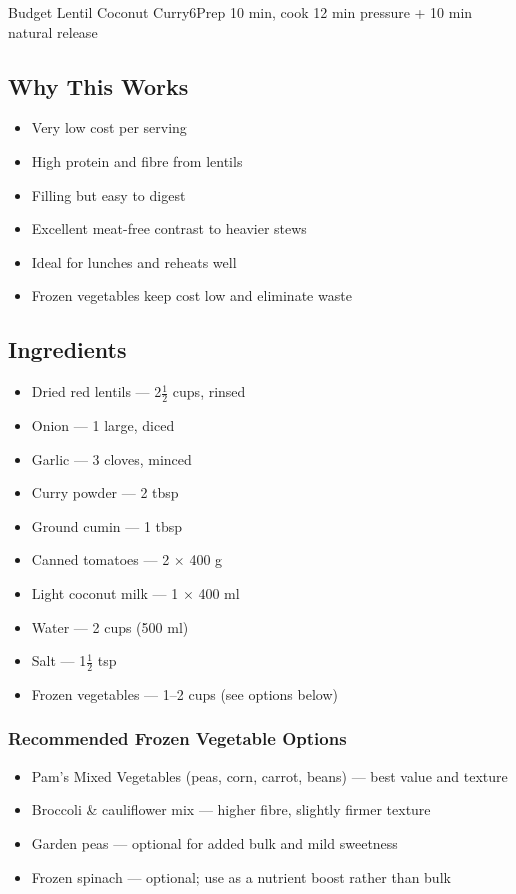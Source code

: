 \begin{recipebox}{Budget Lentil Coconut Curry}{6}{Prep 10 min, cook 12 min pressure + 10 min natural release}
\subsection*{Why This Works}
\begin{itemize}
    \item Very low cost per serving
    \item High protein and fibre from lentils
    \item Filling but easy to digest
    \item Excellent meat-free contrast to heavier stews
    \item Ideal for lunches and reheats well
    \item Frozen vegetables keep cost low and eliminate waste
\end{itemize}

\subsection*{Ingredients}
\begin{itemize}
    \item Dried red lentils — 2$\tfrac{1}{2}$ cups, rinsed
    \item Onion — 1 large, diced
    \item Garlic — 3 cloves, minced
    \item Curry powder — 2 tbsp
    \item Ground cumin — 1 tbsp
    \item Canned tomatoes — 2 $\times$ 400 g
    \item Light coconut milk — 1 $\times$ 400 ml
    \item Water — 2 cups (500 ml)
    \item Salt — 1$\tfrac{1}{2}$ tsp
    \item Frozen vegetables — 1--2 cups (see options below)
\end{itemize}

\subsubsection*{Recommended Frozen Vegetable Options}
\begin{itemize}
    \item Pam's Mixed Vegetables (peas, corn, carrot, beans) — best value and texture
    \item Broccoli \& cauliflower mix — higher fibre, slightly firmer texture
    \item Garden peas — optional for added bulk and mild sweetness
    \item Frozen spinach — optional; use as a nutrient boost rather than bulk
\end{itemize}


\end{recipebox}
